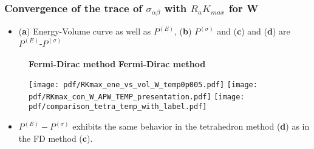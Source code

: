 \documentclass[10pt, handout]{beamer}
\newcommand{\sig}{\sigma}
\newcommand{\nologo}{\setbeamertemplate{logo}{}}  %
\begin{document}
		{\nologo
		\begin{frame}
			\frametitle{ Convergence of the trace of $\sigma_{\alpha\beta}$ with $R_aK_{max}$ for W}
		  \begin{small}	
		  	 \begin{itemize}
		  	 	\item (\textbf{a}) Energy-Volume curve as well as $P^{(E)}$, 
		  	 	(\textbf{b}) $P^{(\sig)}$ and (\textbf{c}) and (\textbf{d}) are $P^{(E)}$-$P^{(\sig)}$
		  	 \end{itemize}		  	
			\begin{figure}
				{\tiny{\textbf{Fermi-Dirac method}} \hspace{2.5cm}  {\textbf{Fermi-Dirac method}} \hspace{3.0cm} {} } \par 
				\texttt{[image: pdf/RKmax\_ene\_vs\_vol\_W\_temp0p005.pdf]} \hfil
				\texttt{[image: pdf/RKmax\_con\_W\_APW\_TEMP\_presentation.pdf]} \hfil
                 \texttt{[image: pdf/comparison\_tetra\_temp\_with\_label.pdf]}
			\end{figure}		    			 
		    	 \begin{itemize}		    				    		
		    		
		    		\item $P^{(E)} - P^{(\sig)}$ exhibits the same behavior in the tetrahedron method (\textbf{d}) as in the FD method (\textbf{c}).		     	
		    	\end{itemize}
		    \end{small}
		\end{frame}
	}
		
\end{document}
